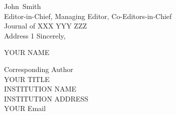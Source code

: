 \documentclass{cover-letter}
\def\EditorFirstName{John}
\def\EditorLastName{Smith}
\def\EditorName{\EditorFirstName~\EditorLastName}
\def\EditorTitle{Editor-in-Chief, Managing Editor, Co-Editors-in-Chief}
\def\JournalName{Journal of XXX YYY ZZZ} %
\def\JournalAddress{Address 1} %
\def\YourName{YOUR NAME}
\def\YourEmail{YOUR Email}
\def\YourTitle{YOUR TITLE}
\def\InstitutionName{INSTITUTION NAME}
\def\InstitutionAddress{INSTITUTION ADDRESS}
\begin{document}
\begin{letter}{\EditorName \\ \EditorTitle \\ \JournalName \\ \JournalAddress}
Sincerely,

\YourName

Corresponding Author\\
\YourTitle\\
\InstitutionName\\
\InstitutionAddress\\
\YourEmail

\end{letter}
\end{document}
